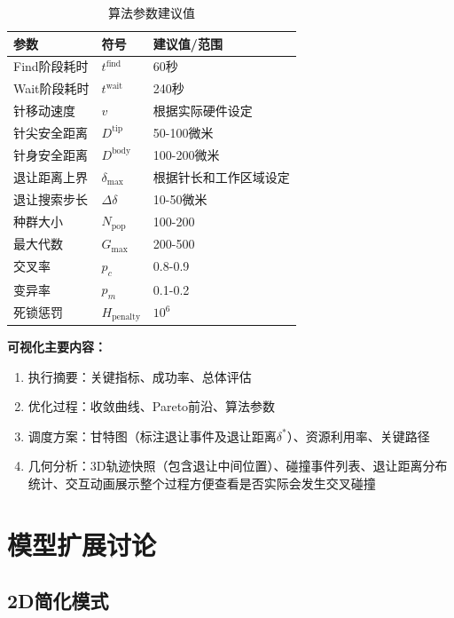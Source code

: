 \documentclass[11pt,a4paper]{article}
\begin{document}
\begin{table}[H]
\centering
\begin{tabular}{|l|l|l|}
\hline
\textbf{参数} & \textbf{符号} & \textbf{建议值/范围} \\
\hline
Find阶段耗时 & $t^{\text{find}}$ & 60秒 \\
Wait阶段耗时 & $t^{\text{wait}}$ & 240秒 \\
针移动速度 & $v$ & 根据实际硬件设定 \\
针尖安全距离 & $D^{\text{tip}}$ & 50-100微米 \\
针身安全距离 & $D^{\text{body}}$ & 100-200微米 \\
退让距离上界 & $\delta_{\max}$ & 根据针长和工作区域设定 \\
退让搜索步长 & $\Delta\delta$ & 10-50微米 \\
种群大小 & $N_{\text{pop}}$ & 100-200 \\
最大代数 & $G_{\max}$ & 200-500 \\
交叉率 & $p_c$ & 0.8-0.9 \\
变异率 & $p_m$ & 0.1-0.2 \\
死锁惩罚 & $H_{\text{penalty}}$ & $10^6$ \\
\hline
\end{tabular}
\caption{算法参数建议值}
\end{table}

\textbf{可视化主要内容：}
\begin{enumerate}
    \item 执行摘要：关键指标、成功率、总体评估
    \item 优化过程：收敛曲线、Pareto前沿、算法参数
    \item 调度方案：甘特图（标注退让事件及退让距离$\delta^*$）、资源利用率、关键路径
    \item 几何分析：3D轨迹快照（包含退让中间位置）、碰撞事件列表、退让距离分布统计、交互动画展示整个过程方便查看是否实际会发生交叉碰撞
\end{enumerate}

\section{模型扩展讨论}

\subsection{2D简化模式}
\end{document}
